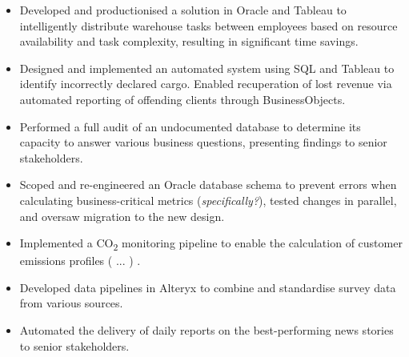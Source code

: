 \documentclass[10pt,a4paper,ragged2e,withhyper]{altacv}
\begin{document}
\begin{paracol}{2}
\begin{itemize}
\medskip
{}

\end{itemize}

\divider

\begin{itemize}
\item Developed and productionised a solution in Oracle and Tableau to intelligently distribute warehouse tasks between employees based on resource availability and task complexity, resulting in significant time savings.
\item Designed and implemented an automated system using SQL and Tableau to identify incorrectly declared cargo. Enabled recuperation of lost revenue via automated reporting of offending clients through BusinessObjects.
\item Performed a full audit of an undocumented database to determine its capacity to answer various business questions, presenting findings to senior stakeholders.
\item Scoped and re-engineered an Oracle database schema to prevent errors when calculating business-critical metrics (\textit{specifically?}), tested changes in parallel, and oversaw migration to the new design.
\item Implemented a CO\textsubscript{2} monitoring pipeline to enable the calculation of customer emissions profiles ( ... ) .

\medskip
{}

\end{itemize}

\divider

\begin{itemize}
\item Developed data pipelines in Alteryx to combine and standardise survey data from various sources.
\item Automated the delivery of daily reports on the best-performing news stories to senior stakeholders.


\end{itemize}
\end{paracol}
\end{document}
